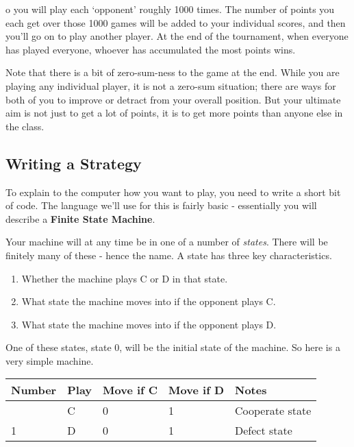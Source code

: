 \documentclass[
  11pt,
]{article}
\providecommand{\tightlist}{%
  \setlength{\itemsep}{0pt}\setlength{\parskip}{0pt}}
\begin{document}
o you will play each `opponent' roughly 1000 times. The number of points
you each get over those 1000 games will be added to your individual
scores, and then you'll go on to play another player. At the end of the
tournament, when everyone has played everyone, whoever has accumulated
the most points wins.

Note that there is a bit of zero-sum-ness to the game at the end. While
you are playing any individual player, it is not a zero-sum situation;
there are ways for both of you to improve or detract from your overall
position. But your ultimate aim is not just to get a lot of points, it
is to get more points than anyone else in the class.

\newpage

\hypertarget{writing-a-strategy}{%
\subsection{Writing a Strategy}\label{writing-a-strategy}}

To explain to the computer how you want to play, you need to write a
short bit of code. The language we'll use for this is fairly basic -
essentially you will describe a \textbf{Finite State Machine}.

Your machine will at any time be in one of a number of \emph{states}.
There will be finitely many of these - hence the name. A state has three
key characteristics.

\begin{enumerate}
\def\labelenumi{\arabic{enumi}.}
\tightlist
\item
  Whether the machine plays C or D in that state.
\item
  What state the machine moves into if the opponent plays C.
\item
  What state the machine moves into if the opponent plays D.
\end{enumerate}

One of these states, state 0, will be the initial state of the machine.
So here is a very simple machine.

\begin{longtable}[]{@{}lllll@{}}
\toprule\noalign{}
Number & Play & Move if C & Move if D & Notes \\
\midrule\noalign{}
\endhead
\bottomrule\noalign{}
\endlastfoot
0 & C & 0 & 1 & Cooperate state \\
1 & D & 0 & 1 & Defect state \\
\end{longtable}
\end{document}

